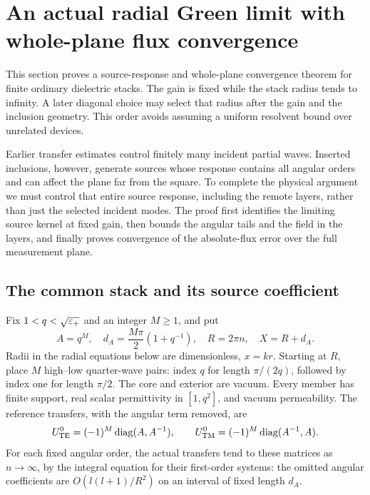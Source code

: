\section{An actual radial Green limit with whole-plane flux convergence}
\label{rg:section}

This section proves a source-response and whole-plane convergence
theorem for finite ordinary dielectric stacks. The gain is fixed while
the stack radius tends to infinity. A later diagonal choice may select
that radius after the gain and the inclusion geometry. This order
avoids assuming a uniform resolvent bound over unrelated devices.

Earlier transfer estimates control finitely many incident partial waves.
Inserted inclusions, however, generate sources whose response contains all
angular orders and can affect the plane far from the square. To complete
the physical argument we must control that entire source response, including
the remote layers, rather than just the selected incident modes. The proof
first identifies the limiting source kernel at fixed gain, then bounds the
angular tails and the field in the layers, and finally proves convergence of
the absolute-flux error over the full measurement plane.

\subsection{The common stack and its source coefficient}

Fix $1<q<\sqrt{\varepsilon_+}$ and an integer $M\geq1$, and put
\begin{equation}\label{rg:stack}
 A=q^M,\quad d_A=\frac{M\pi}{2}(1+q^{-1}),\quad
 R=2\pi n,\quad X=R+d_A.
\end{equation}
Radii in the radial equations below are dimensionless, $x=kr$.
Starting at $R$, place $M$ high--low quarter-wave pairs: index $q$
for length $\pi/(2q)$, followed by index one for length $\pi/2$.
The core and exterior are vacuum. Every member has finite support,
real scalar permittivity in $[1,q^2]$, and vacuum permeability.
The reference transfers, with the angular term removed, are
\begin{equation}\label{rg:reference}
 U_{\rm TE}^0=(-1)^M\operatorname{diag}(A,A^{-1}),\qquad
 U_{\rm TM}^0=(-1)^M\operatorname{diag}(A^{-1},A).
\end{equation}
For each fixed angular order, the actual transfers tend to these
matrices as $n\to\infty$, by the integral equation for their
first-order systems: the omitted angular coefficients are
$O(l(l+1)/R^2)$ on an interval of fixed length $d_A$.

